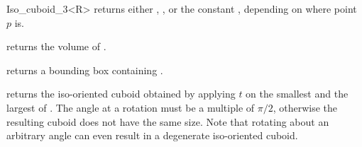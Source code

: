 \begin{ccRefClass} {Iso_cuboid_3<R>}
       {returns either ,
        , or the constant
        , 
        depending on where point $p$ is.}

       {}
\ccGlue
{}
       {}
\ccGlue
{}
       {}


       {returns the volume of \ccVar. }

       {returns a bounding box containing \ccVar. }

       {returns the iso-oriented cuboid obtained by applying $t$ on 
        the smallest and the largest of \ccVar.
        \ccPrecond The angle at a rotation must be a multiple of $\pi/2$,
        otherwise the resulting cuboid does not have the same size.
        Note that rotating about an arbitrary angle can even result in
        a degenerate iso-oriented cuboid.}





\end{ccRefClass} 
